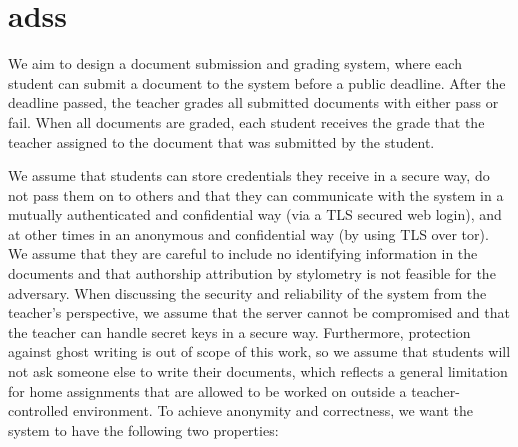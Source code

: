 \section{\Acl*{adss}}
    \label{section:document-submission-system:anonymous-document-submission-system}

We aim to design a document submission and grading system, 
%
where each student can submit a document to the system before a public
deadline. After the deadline passed, the teacher %
grades all submitted
documents with either pass or fail. When all documents are graded, each
student receives the grade that the teacher assigned to the document
that was submitted by the student.

We assume that students can store credentials they receive in a secure
way, do not pass them on to others and that they can communicate with
the system in a mutually authenticated and confidential way (\eg via a TLS
secured web login), and at other times in an anonymous and confidential 
way (\eg by using TLS over \acs{tor}\cite{dingledine_tor_2004}).
We assume that they are careful to include no identifying information in
the documents and that authorship attribution by stylometry is not
feasible for the adversary.
When discussing the security and reliability of the system from the
teacher's perspective, we assume that the server cannot be compromised
and that the teacher can handle secret keys in a secure way.
Furthermore, protection against ghost writing is out of scope of this
work, so we assume that students will not ask someone else to write
their documents, which reflects a general limitation for home
assignments that are allowed to be worked on outside a
teacher-controlled environment.
%
To achieve anonymity and correctness, we want the system to have the
following two properties:
	
